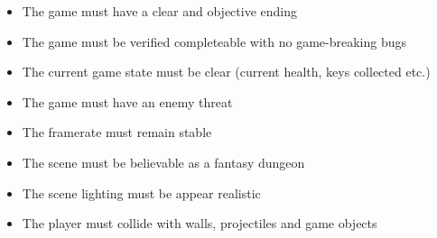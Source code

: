 \documentclass[a4paper, oneside, 11pt]{report}
\begin{document}
\begin{itemize}
    \item The game must have a clear and objective ending
    \item The game must be verified completeable with no game-breaking bugs
    \item The current game state must be clear (current health, keys collected etc.)
    \item The game must have an enemy threat
    \item The framerate must remain stable
    \item The scene must be believable as a fantasy dungeon
    \item The scene lighting must be appear realistic
    \item The player must collide with walls, projectiles and game objects
\end{itemize}
\end{document}
